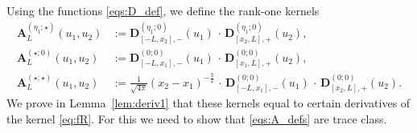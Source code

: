 \documentclass[oneside,final,11pt]{amsart}
\theoremstyle{definition}
\newcommand{\1}[1]{\mathbf{1}_{#1}}
\newcommand{\fx}{x}
\newcommand{\fD}{\mathbf{D}}
\newcommand{\fA}{\mathbf{A}}
\numberwithin{equation}{section}
\begin{document}
Using the functions \eqref{eqs:D_def}, we define the rank-one kernels
\begin{subequations}\label{eqs:A_defs}
\begin{align}
\fA_L^{(\eta_1; \star)}(u_1, u_2) &:= \fD^{(\eta_1; 0)}_{[-L, \fx_2], -}(u_1) \,\cdot\, \fD^{(\eta_1; 0)}_{[\fx_2, L], +}(u_2), \label{eq:A1}\\
\fA_L^{(\star; 0)}(u_1, u_2) &:= \fD^{(0; 0)}_{[-L, \fx_1], -}(u_1) \,\cdot\, \fD^{(0; 0)}_{[\fx_1, L], +}(u_2),\label{eq:A2}\\
\fA_L^{(\star; \star)}(u_1, u_2) &:= \frac{1}{\sqrt{4\pi}} (\fx_2 - \fx_1)^{-\frac{3}{2}} \, \cdot\, \fD^{(0; 0)}_{[-L, \fx_1], -}(u_1) \,\cdot\, \fD^{(0; 0)}_{[\fx_2, L], +}(u_2).\label{eq:A3}
\end{align}
\end{subequations}
We prove in Lemma~\ref{lem:deriv1} that these kernels equal to certain derivatives of the kernel \eqref{eq:fR}. For this we need to show that \eqref{eqs:A_defs} are trace class.
\end{document}
